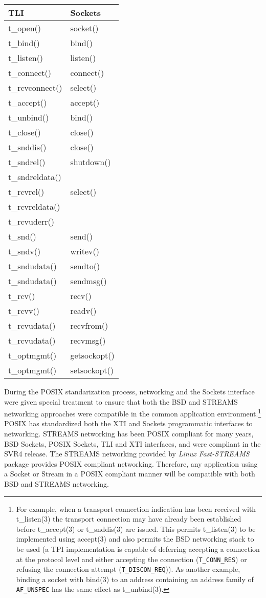 \documentclass[letterpaper,final,notitlepage,twocolumn,10pt,twoside]{article}
\begin{document}
\begin{center}
\begin{tabular}{ll}
TLI & Sockets\\
\hline
t\_open() & socket()\\
t\_bind() & bind()\\
t\_listen() & listen()\\
t\_connect() & connect()\\
t\_rcvconnect() & select()\\
t\_accept() & accept()\\
t\_unbind() & bind()\\
t\_close() & close()\\
t\_snddis() & close()\\
t\_sndrel() & shutdown()\\
t\_sndreldata() & \\
t\_rcvrel() & select()\\
t\_rcvreldata() & \\
t\_rcvuderr() & \\
t\_snd() & send()\\
t\_sndv() & writev()\\
t\_sndudata() & sendto()\\
t\_sndudata() & sendmsg()\\
t\_rcv() & recv()\\
t\_rcvv() & readv()\\
t\_rcvudata() & recvfrom()\\
t\_rcvudata() & recvmsg()\\
t\_optmgmt() & getsockopt()\\
t\_optmgmt() & setsockopt()\\
\hline
\end{tabular}
\end{center}

During the POSIX standarization process, networking and the Sockets interface
were given special treatment to ensure that both the BSD and STREAMS
networking approaches were compatible in the common application
environment.\footnote{For example, when a transport connection indication has
been received with t\_listen(3) the transport connection may have already been
established before t\_accept(3) or t\_snddis(3) are issued.  This permits
t\_listen(3) to be implemented using accept(3) and also permits the BSD
networking stack to be used (a TPI implementation is capable of deferring
accepting a connection at the protocol level and either accepting the
connection (\texttt{T\_CONN\_RES}) or refusing the connection attempt
(\texttt{T\_DISCON\_REQ})).  As another example, binding a socket with bind(3)
to an address containing an address family of \texttt{AF\_UNSPEC} has the same
effect as t\_unbind(3).} POSIX has standardized both the XTI and Sockets
programmatic interfaces to networking.  STREAMS networking has been POSIX
compliant for many years, BSD Sockets, POSIX Sockets, TLI and XTI interfaces,
and were compliant in the SVR4 release.  The STREAMS networking provided by
\textsl{Linux Fast-STREAMS} package provides POSIX compliant networking.
Therefore, any application using a Socket or Stream in a POSIX compliant
manner will be compatible with both BSD and STREAMS networking.
\end{document}
